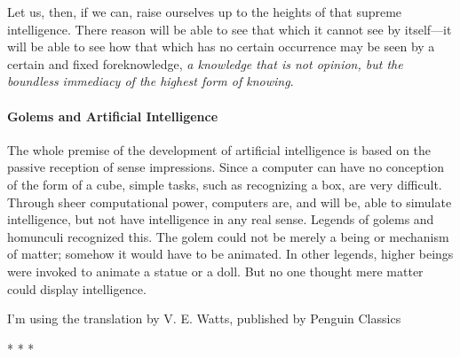 \begin{quotex}
Let us, then, if we can, raise ourselves up to the heights of that supreme intelligence. There reason will be able to see that which it cannot see by itself—it will be able to see how that which has no certain occurrence may be seen by a certain and fixed foreknowledge, \emph{a knowledge that is not opinion, but the boundless immediacy of the highest form of knowing}.

\end{quotex}
\paragraph{Golems and Artificial Intelligence}
The whole premise of the development of artificial intelligence is based on the passive reception of sense impressions. Since a computer can have no conception of the form of a cube, simple tasks, such as recognizing a box, are very difficult. Through sheer computational power, computers are, and will be, able to simulate intelligence, but not have intelligence in any real sense. Legends of golems and homunculi recognized this. The golem could not be merely a being or mechanism of matter; somehow it would have to be animated. In other legends, higher beings were invoked to animate a statue or a doll. But no one thought mere matter could display intelligence.


\hfill

I'm using the translation by V. E. Watts, published by Penguin Classics




\begin{center}* * *\end{center}

